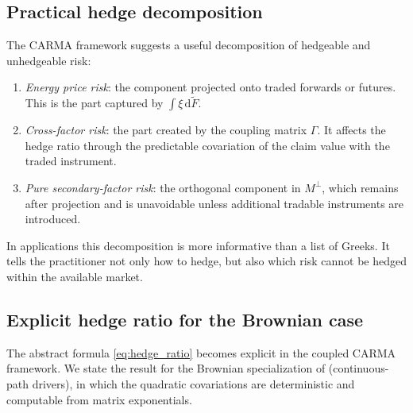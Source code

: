 \documentclass[10pt,reqno]{amsart}
\newcommand{\1}{\mathbbm{1}}
\newcommand{\dd}{\mathrm{d}}
\begin{document}
\subsection{Practical hedge decomposition}

The CARMA framework suggests a useful decomposition of hedgeable and unhedgeable
risk:
\begin{enumerate}[label=(\roman*)]
  \item \emph{Energy price risk}: the component projected onto traded forwards or
    futures. This is the part captured by $\int \xi\,\dd \widetilde{F}$.
  \item \emph{Cross-factor risk}: the part created by the coupling matrix
    $\Gamma$. It affects the hedge ratio through the predictable covariation of
    the claim value with the traded instrument.
  \item \emph{Pure secondary-factor risk}: the orthogonal component in
    $M^{\perp}$, which remains after projection and is unavoidable unless
    additional tradable instruments are introduced.
\end{enumerate}
In applications this decomposition is more informative than a list of Greeks.
It tells the practitioner not only how to hedge, but also which risk cannot be
hedged within the available market.

\subsection{Explicit hedge ratio for the Brownian case}

The abstract formula \eqref{eq:hedge_ratio} becomes explicit in the coupled
CARMA framework. We state the result for the Brownian specialization of
 (continuous-path drivers), in which the
quadratic covariations are deterministic and computable from matrix
exponentials.
\end{document}
